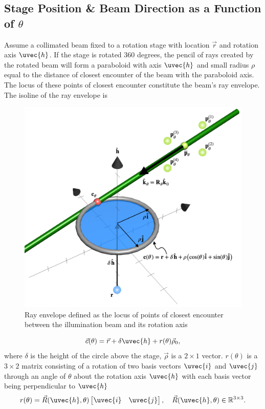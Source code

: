 \subsection{Stage Position \& Beam Direction as a Function of $\theta$}
Assume a collimated beam fixed to a rotation stage with location $\vec{r}$ and rotation axis $\uvec{h}$. If the stage is rotated 360 degrees, the pencil of rays created by the rotated beam will form a paraboloid with axis $\uvec{h}$ and small radius $\rho$ equal to the distance of closest encounter of the beam with the paraboloid axis. The locus of these points of closest encounter constitute the beam's ray envelope. The isoline of the ray envelope is
%
\begin{figure}
    \centering
    \includegraphics[width=0.5\linewidth]{../figures/ray_envelope.png}
    \caption{Ray envelope defined as the locus of points of closest encounter between the illumination beam and its rotation axis}
    \label{fig:ray_envelope_geometry}
\end{figure}
%
\begin{equation}
    \vec{c}(\theta) = \vec{r} + \delta \uvec{h} + r(\theta) \vec{\rho}_0,
    \label{eqn:envelope2}
\end{equation}
%
where $\delta$ is the height of the circle above the stage, $\vec{\rho}$ is a $2 \times 1$ vector. $r(\theta)$ is a $3 \times 2$ matrix consisting of a rotation of two basis vectors $\uvec{i}$ and $\uvec{j}$ through an angle of $\theta$ about the rotation axis $\uvec{h}$ with each basis vector being perpendicular to $\uvec{h}$
%
\begin{equation}
    r(\theta) = \vec{R}(\uvec{h}, \theta) \begin{bmatrix}
        \uvec{i} & \uvec{j}
    \end{bmatrix},
    \quad \vec{R}(\uvec{h}, \theta) \in \mathbb{R}^{3 \times 3}.
\end{equation}

